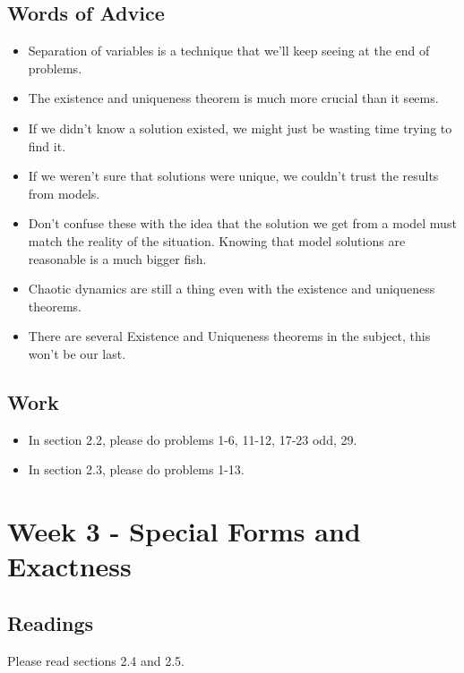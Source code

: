 	\subsection{Words of Advice}
		\begin{itemize}
			\item Separation of variables is a technique that we'll keep seeing at the end of problems.
			\item The existence and uniqueness theorem is much more crucial than it seems.
			\item If we didn't know a solution existed, we might just be wasting time trying to find it.
			\item If we weren't sure that solutions were unique, we couldn't trust the results from models.
			\item Don't confuse these with the idea that the solution we get from a model must match the reality of the situation. Knowing that model solutions are reasonable is a much bigger fish.
			\item Chaotic dynamics are still a thing even with the existence and uniqueness theorems.
			\item There are several Existence and Uniqueness theorems in the subject, this won't be our last.
		\end{itemize}

	\subsection{Work}
		\begin{itemize}
			\item In section 2.2, please do problems 1-6, 11-12, 17-23 odd, 29.
			\item In section 2.3, please do problems 1-13.
		\end{itemize}

	\clearpage



	\section{Week 3 - Special Forms and Exactness}

	\subsection{Readings}
		Please read sections 2.4 and 2.5.

